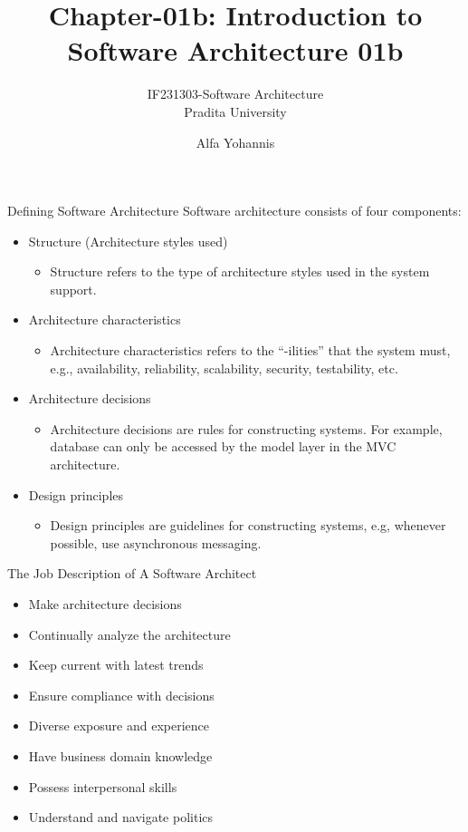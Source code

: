 \documentclass{beamer}
\title{Chapter-01b: Introduction to Software Architecture 01b}
\subtitle{IF231303-Software Architecture\\Pradita University}
\author{Alfa Yohannis}
\begin{document}
\begin{frame}[plain]
    \maketitle
\end{frame}

\begin{frame}{Defining Software Architecture}
Software architecture consists of four components:
\begin{itemize}

\item Structure (Architecture styles used)
\begin{itemize}
\item Structure refers to the type of architecture styles used in the system support.
\end{itemize}

\item Architecture characteristics 
\begin{itemize}
\item Architecture characteristics refers to the ``-ilities'' that the system must, e.g., availability, reliability, scalability, security, testability, etc. 
\end{itemize}

\item Architecture decisions
\begin{itemize}
\item Architecture decisions are rules for constructing systems. For example, database can only be accessed by the model layer in the MVC architecture.
\end{itemize}

\item Design principles
\begin{itemize}
\item Design principles are guidelines for constructing systems, e.g, whenever possible, use asynchronous messaging.
\end{itemize}

\end{itemize}
\end{frame}

\begin{frame}{The Job Description of A Software Architect}
\begin{itemize}
\item Make architecture decisions
\item Continually analyze the architecture
\item Keep current with latest trends
\item Ensure compliance with decisions
\item Diverse exposure and experience
\item Have business domain knowledge
\item Possess interpersonal skills
\item Understand and navigate politics
\end{itemize}
\end{frame}
\end{document}
